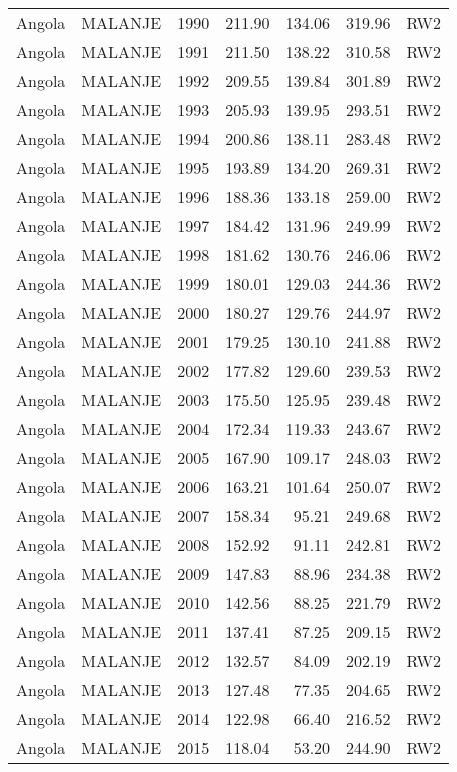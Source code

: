 \begin{longtable}{lllrrrl}
  Angola & MALANJE & 1990 & 211.90 & 134.06 & 319.96 & RW2 \\ 
  Angola & MALANJE & 1991 & 211.50 & 138.22 & 310.58 & RW2 \\ 
  Angola & MALANJE & 1992 & 209.55 & 139.84 & 301.89 & RW2 \\ 
  Angola & MALANJE & 1993 & 205.93 & 139.95 & 293.51 & RW2 \\ 
  Angola & MALANJE & 1994 & 200.86 & 138.11 & 283.48 & RW2 \\ 
  Angola & MALANJE & 1995 & 193.89 & 134.20 & 269.31 & RW2 \\ 
  Angola & MALANJE & 1996 & 188.36 & 133.18 & 259.00 & RW2 \\ 
  Angola & MALANJE & 1997 & 184.42 & 131.96 & 249.99 & RW2 \\ 
  Angola & MALANJE & 1998 & 181.62 & 130.76 & 246.06 & RW2 \\ 
  Angola & MALANJE & 1999 & 180.01 & 129.03 & 244.36 & RW2 \\ 
  Angola & MALANJE & 2000 & 180.27 & 129.76 & 244.97 & RW2 \\ 
  Angola & MALANJE & 2001 & 179.25 & 130.10 & 241.88 & RW2 \\ 
  Angola & MALANJE & 2002 & 177.82 & 129.60 & 239.53 & RW2 \\ 
  Angola & MALANJE & 2003 & 175.50 & 125.95 & 239.48 & RW2 \\ 
  Angola & MALANJE & 2004 & 172.34 & 119.33 & 243.67 & RW2 \\ 
  Angola & MALANJE & 2005 & 167.90 & 109.17 & 248.03 & RW2 \\ 
  Angola & MALANJE & 2006 & 163.21 & 101.64 & 250.07 & RW2 \\ 
  Angola & MALANJE & 2007 & 158.34 & 95.21 & 249.68 & RW2 \\ 
  Angola & MALANJE & 2008 & 152.92 & 91.11 & 242.81 & RW2 \\ 
  Angola & MALANJE & 2009 & 147.83 & 88.96 & 234.38 & RW2 \\ 
  Angola & MALANJE & 2010 & 142.56 & 88.25 & 221.79 & RW2 \\ 
  Angola & MALANJE & 2011 & 137.41 & 87.25 & 209.15 & RW2 \\ 
  Angola & MALANJE & 2012 & 132.57 & 84.09 & 202.19 & RW2 \\ 
  Angola & MALANJE & 2013 & 127.48 & 77.35 & 204.65 & RW2 \\ 
  Angola & MALANJE & 2014 & 122.98 & 66.40 & 216.52 & RW2 \\ 
  Angola & MALANJE & 2015 & 118.04 & 53.20 & 244.90 & RW2 \\ 

\end{longtable}
